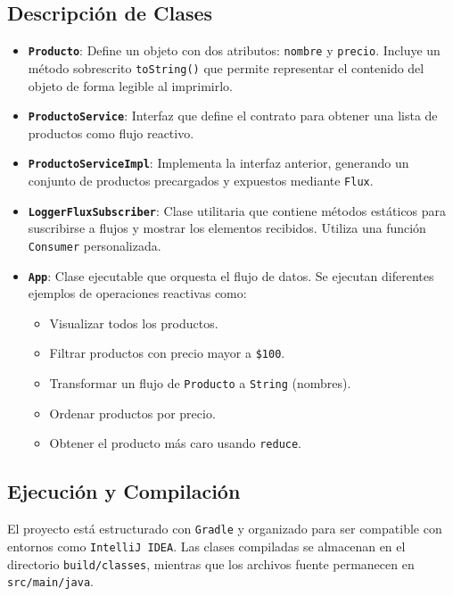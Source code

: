 \subsection{Descripción de Clases}

\begin{itemize}
    \item \textbf{\texttt{Producto}}: Define un objeto con dos atributos: \texttt{nombre} y \texttt{precio}. Incluye un método sobrescrito \texttt{toString()} que permite representar el contenido del objeto de forma legible al imprimirlo.
    \item \textbf{\texttt{ProductoService}}: Interfaz que define el contrato para obtener una lista de productos como flujo reactivo.
    \item \textbf{\texttt{ProductoServiceImpl}}: Implementa la interfaz anterior, generando un conjunto de productos precargados y expuestos mediante \texttt{Flux}.
    \item \textbf{\texttt{LoggerFluxSubscriber}}: Clase utilitaria que contiene métodos estáticos para suscribirse a flujos y mostrar los elementos recibidos. Utiliza una función \texttt{Consumer} personalizada.
    \item \textbf{\texttt{App}}: Clase ejecutable que orquesta el flujo de datos. Se ejecutan diferentes ejemplos de operaciones reactivas como:
    \begin{itemize}
        \item Visualizar todos los productos.
        \item Filtrar productos con precio mayor a \texttt{\$100}.
        \item Transformar un flujo de \texttt{Producto} a \texttt{String} (nombres).
        \item Ordenar productos por precio.
        \item Obtener el producto más caro usando \texttt{reduce}.
    \end{itemize}
\end{itemize}

\subsection{Ejecución y Compilación}

El proyecto está estructurado con \texttt{Gradle} y organizado para ser compatible con entornos como \texttt{IntelliJ IDEA}. Las clases compiladas se almacenan en el directorio \texttt{build/classes}, mientras que los archivos fuente permanecen en \texttt{src/main/java}.

